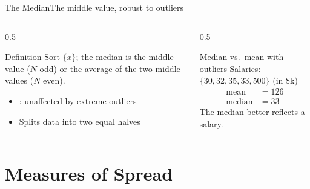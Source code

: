 \documentclass[aspectratio=169,11pt]{beamer}
\begin{document}
\begin{frame}{The Median}{The middle value, robust to outliers}
  \begin{columns}[T]
    \begin{column}{0.5\textwidth}
      \begin{block}{Definition}
        \small Sort $\{x\}$; the median is the middle value
        ($N$ odd) or the average of the two middle values ($N$ even).
      \end{block}
      \begin{itemize}\small
        \item {}: unaffected by extreme outliers
        \item Splits data into two equal halves
      \end{itemize}
    \end{column}
    \begin{column}{0.5\textwidth}
      \begin{exampleblock}{Median vs.\ mean with outliers}
        \small Salaries: $\{30, 32, 35, 33, 500\}$ (in \$k)
        \begin{align*}
          \text{mean} &= 126 \\
          \text{median} &= 33
        \end{align*}
        \small The median better reflects a  salary.
      \end{exampleblock}
    \end{column}
  \end{columns}
\end{frame}

\section{Measures of Spread}
\end{document}
